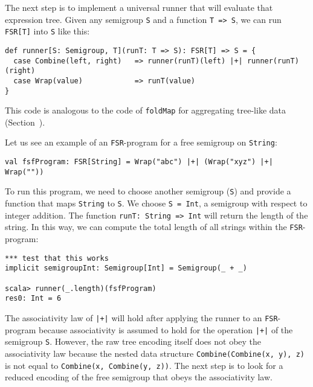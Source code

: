 The next step is to implement a universal runner that will evaluate
that expression tree. Given any semigroup \lstinline!S!
and a function \lstinline!T => S!,
we can run \lstinline!FSR[T]!
into \lstinline!S! like
this:
\begin{lstlisting}
def runner[S: Semigroup, T](runT: T => S): FSR[T] => S = {
  case Combine(left, right)   => runner(runT)(left) |+| runner(runT)(right)
  case Wrap(value)            => runT(value)
}
\end{lstlisting}
This code is analogous to the code of \lstinline!foldMap!
for aggregating
tree-like data (Section~).

Let us see an example of an \lstinline!FSR!-program
for a free semigroup on \lstinline!String!:
\begin{lstlisting}
val fsfProgram: FSR[String] = Wrap("abc") |+| (Wrap("xyz") |+| Wrap(""))
\end{lstlisting}
 To run this program, we need to choose another semigroup (\lstinline!S!)
and provide a function that maps \lstinline!String!
to \lstinline!S!. We choose
\lstinline!S = Int!, a
semigroup with respect to integer addition. The function \lstinline!runT: String => Int!
will return the length of the string. In this way, we can compute
the total length of all strings within the \lstinline!FSR!-program:
\begin{lstlisting}
*** test that this works
implicit semigroupInt: Semigroup[Int] = Semigroup(_ + _)

scala> runner(_.length)(fsfProgram)
res0: Int = 6
\end{lstlisting}
The associativity law of \lstinline!|+|!
will hold after applying the runner to an \lstinline!FSR!-program
because associativity is assumed to hold for the operation \lstinline!|+|!
of the semigroup \lstinline!S!.
However, the raw tree encoding itself does not obey the associativity
law because the nested data structure \lstinline!Combine(Combine(x, y), z)!
is not equal to \lstinline!Combine(x, Combine(y, z))!.
The next step is to look for a reduced encoding of the free semigroup
that obeys the associativity law.

